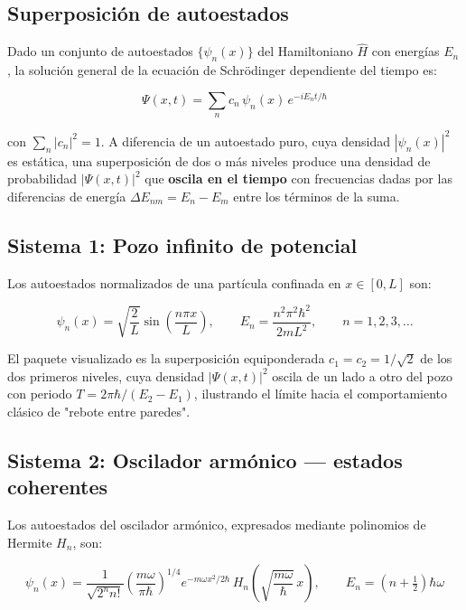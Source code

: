 \documentclass[12pt, a4paper]{article}
\begin{document}
\subsection{Superposición de autoestados}

Dado un conjunto de autoestados $\{\psi_n(x)\}$ del Hamiltoniano
$\hat H$ con energías $E_n$, la solución general de la ecuación de
Schrödinger dependiente del tiempo es:

\begin{equation}
  \Psi(x,t) = \sum_n c_n\, \psi_n(x)\, e^{-iE_n t/\hbar}
  \label{eq:superposicion}
\end{equation}

con $\sum_n |c_n|^2 = 1$. A diferencia de un autoestado puro, cuya
densidad $|\psi_n(x)|^2$ es estática, una superposición de dos o más
niveles produce una densidad de probabilidad $|\Psi(x,t)|^2$ que
\textbf{oscila en el tiempo} con frecuencias dadas por las diferencias
de energía $\Delta E_{nm} = E_n - E_m$ entre los términos de la suma.

\subsection{Sistema 1: Pozo infinito de potencial}

Los autoestados normalizados de una partícula confinada en
$x \in [0,L]$ son:

\begin{equation}
  \psi_n(x) = \sqrt{\frac{2}{L}}\sin\!\left(\frac{n\pi x}{L}\right),
  \qquad
  E_n = \frac{n^2\pi^2\hbar^2}{2mL^2}, \qquad n=1,2,3,\ldots
  \label{eq:pozo_inf}
\end{equation}

El paquete visualizado es la superposición equiponderada
$c_1=c_2=1/\sqrt2$ de los dos primeros niveles, cuya densidad
$|\Psi(x,t)|^2$ oscila de un lado a otro del pozo con periodo
$T = 2\pi\hbar/(E_2-E_1)$, ilustrando el límite hacia el comportamiento
clásico de "rebote entre paredes".

\subsection{Sistema 2: Oscilador armónico — estados coherentes}

Los autoestados del oscilador armónico, expresados mediante
polinomios de Hermite $H_n$, son:

\begin{equation}
  \psi_n(x) = \frac{1}{\sqrt{2^n n!}}
  \left(\frac{m\omega}{\pi\hbar}\right)^{1/4}
  e^{-m\omega x^2/2\hbar}\, H_n\!\left(\sqrt{\frac{m\omega}{\hbar}}\,x\right),
  \qquad E_n = \left(n+\tfrac12\right)\hbar\omega
  \label{eq:osc_1d}
\end{equation}
\end{document}
